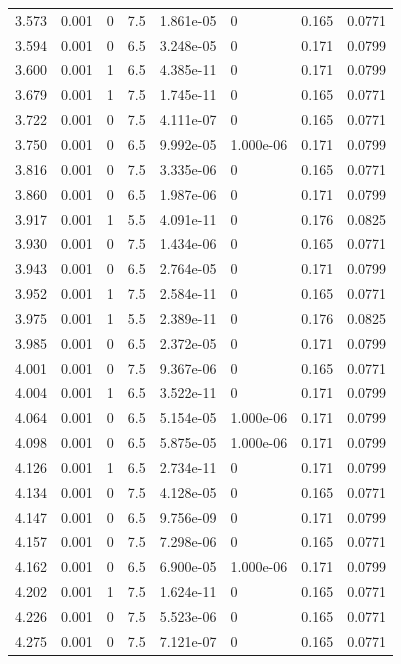 \documentclass[preview]{standalone}
\begin{document}
{{{{\begin{tabular}{L{1.2cm}C{1.2cm} C{0.3cm}C{0.5cm} C{1.4cm}C{1.4cm} C{1.4cm}C{1.4cm}}
  3.573  &  0.001  & 0     & 7.5 &  1.861e-05  & 0  & 0.165 &  0.0771   \\ 
  3.594  &  0.001  & 0     & 6.5 &  3.248e-05  & 0  & 0.171 &  0.0799   \\ 
  3.600  &  0.001  & 1     & 6.5 &  4.385e-11  & 0  & 0.171 &  0.0799   \\ 
  3.679  &  0.001  & 1     & 7.5 &  1.745e-11  & 0  & 0.165 &  0.0771   \\ 
  3.722  &  0.001  & 0     & 7.5 &  4.111e-07  & 0  & 0.165 &  0.0771   \\ 
  3.750  &  0.001  & 0     & 6.5 &  9.992e-05  & 1.000e-06  & 0.171 &  0.0799   \\ 
  3.816  &  0.001  & 0     & 7.5 &  3.335e-06  & 0  & 0.165 &  0.0771   \\ 
  3.860  &  0.001  & 0     & 6.5 &  1.987e-06  & 0  & 0.171 &  0.0799   \\ 
  3.917  &  0.001  & 1     & 5.5 &  4.091e-11  & 0  & 0.176 &  0.0825   \\ 
  3.930  &  0.001  & 0     & 7.5 &  1.434e-06  & 0  & 0.165 &  0.0771   \\ 
  3.943  &  0.001  & 0     & 6.5 &  2.764e-05  & 0  & 0.171 &  0.0799   \\ 
  3.952  &  0.001  & 1     & 7.5 &  2.584e-11  & 0  & 0.165 &  0.0771   \\ 
  3.975  &  0.001  & 1     & 5.5 &  2.389e-11  & 0  & 0.176 &  0.0825   \\ 
  3.985  &  0.001  & 0     & 6.5 &  2.372e-05  & 0  & 0.171 &  0.0799   \\ 
  4.001  &  0.001  & 0     & 7.5 &  9.367e-06  & 0  & 0.165 &  0.0771   \\ 
  4.004  &  0.001  & 1     & 6.5 &  3.522e-11  & 0  & 0.171 &  0.0799   \\ 
  4.064  &  0.001  & 0     & 6.5 &  5.154e-05  & 1.000e-06  & 0.171 &  0.0799   \\ 
  4.098  &  0.001  & 0     & 6.5 &  5.875e-05  & 1.000e-06  & 0.171 &  0.0799   \\ 
  4.126  &  0.001  & 1     & 6.5 &  2.734e-11  & 0  & 0.171 &  0.0799   \\ 
  4.134  &  0.001  & 0     & 7.5 &  4.128e-05  & 0  & 0.165 &  0.0771   \\ 
  4.147  &  0.001  & 0     & 6.5 &  9.756e-09  & 0  & 0.171 &  0.0799   \\ 
  4.157  &  0.001  & 0     & 7.5 &  7.298e-06  & 0  & 0.165 &  0.0771   \\ 
  4.162  &  0.001  & 0     & 6.5 &  6.900e-05  & 1.000e-06  & 0.171 &  0.0799   \\ 
  4.202  &  0.001  & 1     & 7.5 &  1.624e-11  & 0  & 0.165 &  0.0771   \\ 
  4.226  &  0.001  & 0     & 7.5 &  5.523e-06  & 0  & 0.165 &  0.0771   \\ 
  4.275  &  0.001  & 0     & 7.5 &  7.121e-07  & 0  & 0.165 &  0.0771   \\ 
\hline 
\end{tabular} 

}}}}
\end{document}
